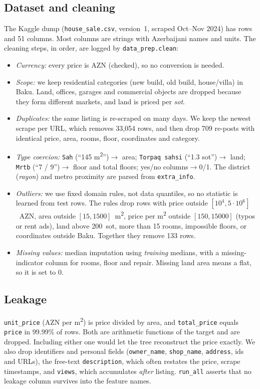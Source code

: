 \documentclass[10pt,twocolumn,a4paper]{article}
\newcommand{\schwa}{\raisebox{\depth}{\rotatebox{180}{e}}}   %
\begin{document}
\subsection{Dataset and cleaning}
The Kaggle dump (\texttt{house\_sale.csv}, version~1, scraped Oct--Nov 2024) has \NRaw{} rows and 51 columns.
Most columns are strings with Azerbaijani names and units. The cleaning steps, in order, are logged by \texttt{data\_prep.clean}:
\begin{itemize}\setlength\itemsep{0pt}
\item \emph{Currency:} every price is AZN (checked), so no conversion is needed.
\item \emph{Scope:} we keep residential categories (new build, old build, house/villa) in Baku.
  Land, offices, garages and commercial objects are dropped because they form different markets,
  and land is priced per \emph{sot}.
\item \emph{Duplicates:} the same listing is re-scraped on many days. We keep the newest scrape per URL,
  which removes 33,054 rows, and then drop 709 re-posts with identical price, area, rooms, floor,
  coordinates and category.
\item \emph{Type coercion:} \texttt{Sah\schwa{}} (``145 m\textsuperscript{2}'')$\to$ area;
  \texttt{Torpaq sah\schwa{}si} (``1.3 sot'')$\to$ land; \texttt{M\schwa{}rt\schwa{}b\schwa{}} (``7 / 9'')$\to$ floor and total floors;
  yes/no columns$\to$0/1. The district (\emph{rayon}) and metro proximity are parsed from \texttt{extra\_info}.
\item \emph{Outliers:} we use fixed domain rules, not data quantiles, so no statistic is learned from test rows.
  The rules drop rows with price outside $[10^4, 5{\cdot}10^6]$~AZN, area outside $[15,1500]$~m\textsuperscript{2},
  price per m\textsuperscript{2} outside $[150,15000]$ (typos or rent ads), land above 200~sot,
  more than 15 rooms, impossible floors, or coordinates outside Baku. Together they remove 133 rows.
\item \emph{Missing values:} median imputation using \emph{training} medians, with a missing-indicator
  column for rooms, floor and repair. Missing land area means a flat, so it is set to 0.
\end{itemize}

\subsection{Leakage}
\texttt{unit\_price} (AZN per m\textsuperscript{2}) is price divided by area, and \texttt{total\_price}
equals \texttt{price} in 99.99\% of rows. Both are arithmetic functions of the target and are dropped. Including either one would
let the tree reconstruct the price exactly. We also drop identifiers and personal fields
(\texttt{owner\_name}, \texttt{shop\_name}, \texttt{address}, ids and URLs), the free-text \texttt{description},
which often restates the price, scrape timestamps, and \texttt{views}, which accumulates \emph{after} listing.
\texttt{run\_all} asserts that no leakage column survives into the feature names.
\end{document}

